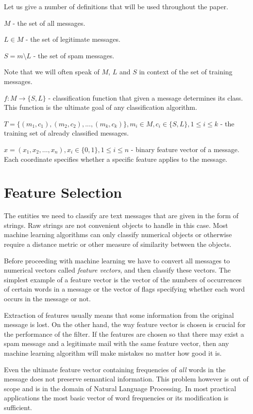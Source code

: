 \documentclass[12pt]{report}
\begin{document}
Let us give a number of definitions that will be used throughout the paper.

$M$ - the set of all messages.

$L \in M$ - the set of legitimate messages.

$S = m \setminus L$ - the set of spam messages.

Note that we will often speak of $M$, $L$ and $S$ in context of the set of training messages.

$f : M \rightarrow \{S, L\}$ - classification function that given a message determines its class. This function is the ultimate goal of any classification algorithm.

$T = \{(m_1, c_1), (m_2, c_2), ..., (m_k, c_k)\}, m_i \in M, c_i \in \{S, L\}, 1 \leq i \leq k$ - the training set of already classified messages.

$x = (x_1, x_2, \dots, x_n), x_i \in \{0, 1\}, 1 \leq i \leq n$ - binary feature vector of a message. Each coordinate specifies whether a specific feature applies to the message.

\newpage

\section{Feature Selection}

The entities we need to classify are text messages that are given in the form of strings. Raw strings are not convenient objects to handle in this case. Most machine learning algorithms can only classify numerical objects or otherwise require a distance metric or other measure of similarity between the objects.

Before proceeding with machine learning we have to convert all messages to numerical vectors called \textit{feature vectors}, and then classify these vectors. The simplest example of a feature vector is the vector of the numbers of occurrences of certain words in a message or the vector of flags specifying whether each word occurs in the message or not.

Extraction of features usually means that some information from the original message is lost. On the other hand, the way feature vector is chosen is crucial for the performance of the filter. If the features are chosen so that there may exist a spam message and a legitimate mail with the same feature vector, then any machine learning algorithm will make mistakes no matter how good it is.

Even the ultimate feature vector containing frequencies of \textit{all} words in the message does not preserve semantical information. This problem however is out of scope and is in the domain of Natural Language Processing. In most practical applications the most basic vector of word frequencies or its modification is sufficient.
\end{document}
